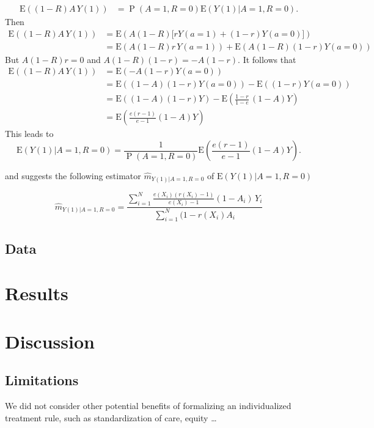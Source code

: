 \documentclass[10pt]{article}
\newcommand{\Esp}{\mbox{E}}
\DeclareMathOperator{\Prob}{P}
\begin{document}
\begin{align*}
	\Esp((1-R)A \, Y(1))&=\Prob(A=1,R=0) \Esp(Y(1)|A=1, R=0).
\end{align*}
Then
\begin{align*}
		\Esp((1-R)A \, Y(1))&=\Esp(A(1-R) \lbrack r Y(a=1)+(1-r)Y(a=0)\rbrack )\\
		                    &=\Esp(A(1-R)r \,Y(a=1))+\Esp(A(1-R)(1-r)Y(a=0))
\end{align*}
But $A(1-R)r=0$ and $A(1-R)(1-r)= -A (1-r)$. It follows that
\begin{align*}
	\Esp((1-R)A \, Y(1))&= \Esp(-A (1-r) Y(a=0))\\
	                    &= \Esp((1-A) (1-r) Y(a=0))-\Esp((1-r) Y(a=0))\\
	                    &=\Esp((1-A) (1-r) Y)-\Esp(\frac{1-r}{1-e}\,(1-A) Y)\\
	                    &=\Esp(\frac{e(r-1)}{e-1} (1-A) Y)
\end{align*}
This leads to
\begin{equation*}
	\Esp(Y(1)|A=1, R=0)=\frac{1}{\Prob(A=1,R=0)}\Esp(\frac{e(r-1)}{e-1} (1-A) Y).
\end{equation*}

and suggests the following estimator $\widehat{m}_{Y(1)|A=1, R=0}$ of $\Esp(Y(1)|A=1, R=0)$

\begin{equation*}
\widehat{m}_{Y(1)|A=1, R=0}= \frac{\sum_{i=1}^N \frac{e(X_i)(r(X_i)-1)}{e(X_i)-1} (1-A_i) \, Y_i}{\sum_{i=1}^N (1-r(X_i) A_i} 
\end{equation*}

\subsection{Data}

\section{Results}

\section{Discussion}


\subsection{Limitations}
We did not consider other potential benefits of formalizing an individualized treatment rule, such as standardization of care, equity \ldots


%
%
\end{document}
